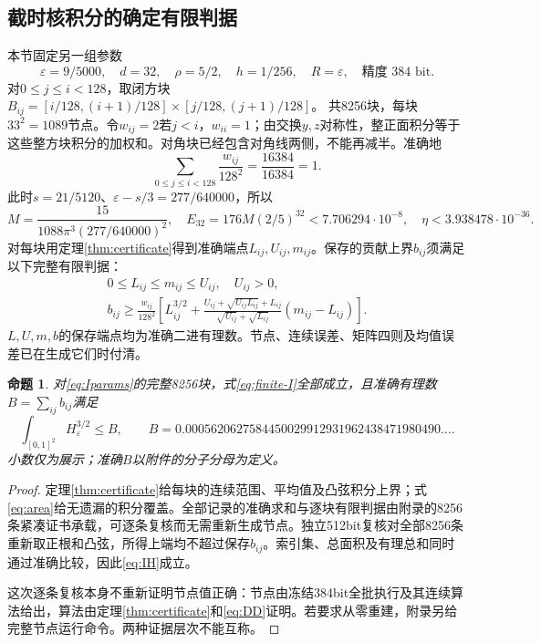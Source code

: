 \documentclass[UTF8,11pt,a4paper,fontset=fandol]{ctexart}
\newtheorem{proposition}[theorem]{命题}
\theoremstyle{definition}\newtheorem{definition}[theorem]{定义}
\theoremstyle{remark}\newtheorem{remark}[theorem]{注}
\begin{document}
\subsection{截时核积分的确定有限判据}
本节固定另一组参数
\begin{equation}\label{eq:Iparams}
 \varepsilon=9/5000,\quad d=32,\quad\rho=5/2,\quad
 h=1/256,\quad R=\varepsilon,\quad\text{精度 }384\text{ bit}.
\end{equation}
对$0\le j\le i<128$，取闭方块
$B_{ij}=[i/128,(i+1)/128]\times[j/128,(j+1)/128]$。
共8256块，每块$33^2=1089$节点。令$w_{ij}=2$若$j<i$，$w_{ii}=1$；由交换$y,z$对称性，整正面积分等于这些整方块积分的加权和。对角块已经包含对角线两侧，不能再减半。准确地
\begin{equation}\label{eq:area}
 \sum_{0\le j\le i<128}\frac{w_{ij}}{128^2}
 =\frac{16384}{16384}=1.
\end{equation}
此时$s=21/5120$、$\varepsilon-s/3=277/640000$，所以
\begin{equation}\label{eq:Ierrors}
 M=\frac{15}{1088\pi^3(277/640000)^2},\quad
 E_{32}=176M(2/5)^{32}<7.706294\cdot10^{-8},\quad
 \eta<3.938478\cdot10^{-36}.
\end{equation}
对每块用定理\ref{thm:certificate}得到准确端点$L_{ij},U_{ij},m_{ij}$。保存的贡献上界$b_{ij}$须满足以下完整有限判据：
\begin{equation}\label{eq:finite-I}
 \begin{gathered}
 0\le L_{ij}\le m_{ij}\le U_{ij},\quad U_{ij}>0,\\
 b_{ij}\ge\frac{w_{ij}}{128^2}\left[
 L_{ij}^{3/2}+\frac{U_{ij}+\sqrt{U_{ij}L_{ij}}+L_{ij}}
 {\sqrt{U_{ij}}+\sqrt{L_{ij}}}(m_{ij}-L_{ij})\right].
 \end{gathered}
\end{equation}
$L,U,m,b$的保存端点均为准确二进有理数。节点、连续误差、矩阵四则及均值误差已在生成它们时付清。

\begin{proposition}\label{prop:IH}
对\eqref{eq:Iparams}的完整8256块，式\eqref{eq:finite-I}全部成立，且准确有理数
$B=\sum_{ij}b_{ij}$满足
\begin{equation}\label{eq:IH}
 \int_{[0,1]^2}H_\varepsilon^{3/2}\le B,
 \qquad B=0.0005620627584450029912931962438471980490\ldots.
\end{equation}
小数仅为展示；准确$B$以附件的分子分母为定义。
\end{proposition}
\begin{proof}
定理\ref{thm:certificate}给每块的连续范围、平均值及凸弦积分上界；式\eqref{eq:area}给无遗漏的积分覆盖。全部记录的准确求和与逐块有限判据由附录的8256条紧凑证书承载，可逐条复核而无需重新生成节点。独立512bit复核对全部8256条重新取正根和凸弦，所得上端均不超过保存$b_{ij}$。索引集、总面积及有理总和同时通过准确比较，因此\eqref{eq:IH}成立。

这次逐条复核本身不重新证明节点值正确：节点由冻结384bit全批执行及其连续算法给出，算法由定理\ref{thm:certificate}和\eqref{eq:DD}证明。若要求从零重建，附录另给完整节点运行命令。两种证据层次不能互称。
\end{proof}
\end{document}
